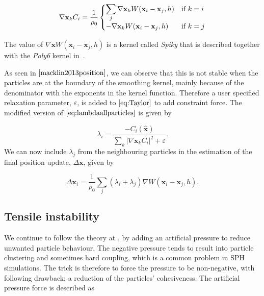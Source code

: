 \begin{equation}
 \nabla \mathbf{x}_k C_i = \frac{1}{\rho_0}
  \begin{cases}
  \label{eq:NablaC}
   \displaystyle \sum\limits_{j} \nabla \mathbf{x}_k W(\mathbf{x}_i - \mathbf{x}_j, h) & $\text{if }$ k = i \\
   - \nabla \mathbf{x}_k W(\mathbf{x}_i - \mathbf{x}_j, h) & $\text{if }$ k = j \\
  \end{cases}
\end{equation}

The value of $ \nabla \mathbf{x} W(\mathbf{x}_i - \mathbf{x}_j, h) $ is a
kernel called \textit{Spiky} that is described together with the \textit{Poly6}
kernel in~\cite{muller2003particle}.

As seen in $\cite{macklin2013position}$, we can observe that this is not stable
when the particles are at the boundary of the smoothing kernel, mainly because
of the denominator with the exponents in the kernel function.  Therefore a user
specified relaxation parameter, $\varepsilon$, is added to $\ref{eq:Taylor}$ to
add constraint force. The modified version of $\ref{eq:lambdaallparticles}$ is
given by

\begin{equation}
\label{eq:LambdaEpsilon}
\lambda_i = \frac{- C_i(\hat{\mathbf{x}}) }{ \sum\limits_{k} |\nabla \mathbf{x}_k C_i|^2 + \varepsilon}.
\end{equation}
We can now include $\lambda_j$ from the neighbouring particles in the
estimation of the final position update, $\Delta \mathbf{x}$, given by

\begin{equation}
\label{eq:DeltaP}
\Delta \mathbf{x}_i = \frac{1}{\rho_0} \sum\limits_{j} (\lambda_i + \lambda_j) \nabla W(\mathbf{x}_i - \mathbf{x}_j, h).
\end{equation}

\subsection{Tensile instability} We continue to follow the theory at
\cite{macklin2013position}, by adding an artificial pressure to reduce unwanted
particle behaviour. The negative pressure tends to result into particle
clustering and sometimes hard coupling, which is a common problem in SPH
simulations. The trick is therefore to force the pressure to be non-negative,
with following drawback; a reduction of the particles' cohesiveness. The
artificial pressure force is described as

